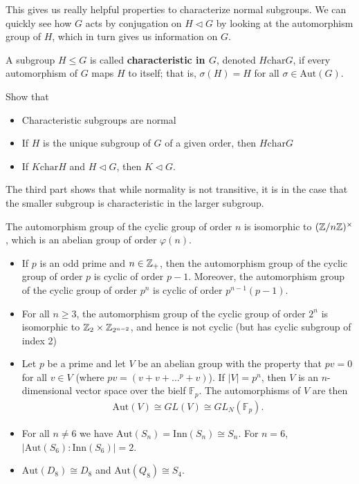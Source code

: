 \documentclass{memoir}
\begin{document}
This gives us really helpful properties to characterize normal subgroups. We can quickly see how \(G\) acts by conjugation on \(H \triangleleft G\) by looking at the automorphism group of \(H\), which in turn gives us information on \(G\).

\begin{defn}
	A subgroup \(H\leq G\) is called \textbf{characteristic in \(G\)}, denoted \(H \textrm{char}G\), if every automorphism of \(G\) maps \(H\) to itself; that is, \(\sigma (H) = H\) for all \(\sigma  \in \textrm{Aut}(G)\).
\end{defn}

\begin{hw}
	Show that
	\begin{itemize}
		\item Characteristic subgroups are normal
		\item If \(H\) is the unique subgroup of \(G\) of a given order, then \(H \textrm{char}G\)
		\item If \(K \textrm{char}H\) and \(H \triangleleft G\), then \(K \triangleleft G\).
	\end{itemize}
\end{hw}
The third part shows that while normality is not transitive, it is in the case that the smaller subgroup is characteristic in the larger subgroup.
\begin{prop}
	The automorphism group of the cyclic group of order \(n\) is isomorphic to \((\mathbb{Z} / n\mathbb{Z})^{\times }\), which is an abelian group of order \(\varphi (n)\).
\end{prop}

\begin{prop}
	\begin{itemize}
		\item If \(p\) is an odd prime and \(n \in \mathbb{Z}_+\), then the automorphism group of the cyclic group of order \(p\) is cyclic of order \(p-1\). Moreover, the automorphism group of the cyclic group of order \(p^{n}\) is cyclic of order \(p^{n-1}(p-1)\).
		\item For all \(n\geq 3\), the automorphism group of the cyclic group of order \(2^{n}\) is isomorphic to \(\mathbb{Z}_2 \times \mathbb{Z}_{2^{n-2}}\), and hence is not cyclic (but has cyclic subgroup of index 2)
		\item Let \(p\) be a prime and let \(V\) be an abelian group with the property that \(pv = 0\) for all \(v \in V\) (where \(pv = (v+v+\ldots^{p}+v)\)). If \(\left| V \right| = p^{n}\), then \(V\) is an \(n\)-dimensional vector space over the bielf \(\mathbb{F}_p\). The automorphisms of \(V\) are then
			\begin{align*}
				\textrm{Aut}(V) \cong GL(V) \cong GL_N(\mathbb{F}_p).
			\end{align*}
		\item For all \(n\neq 6\) we have \(\textrm{Aut}(S_n) = \textrm{Inn}(S_n) \cong S_n\). For \(n=6\), \(\left| \textrm{Aut}(S_6) : \textrm{Inn}(S_6) \right| =2\).
		\item \(\textrm{Aut}(D_8) \cong D_8\) and \(\textrm{Aut}(Q_8) \cong S_4\).
	\end{itemize}
\end{prop}

\end{document}

